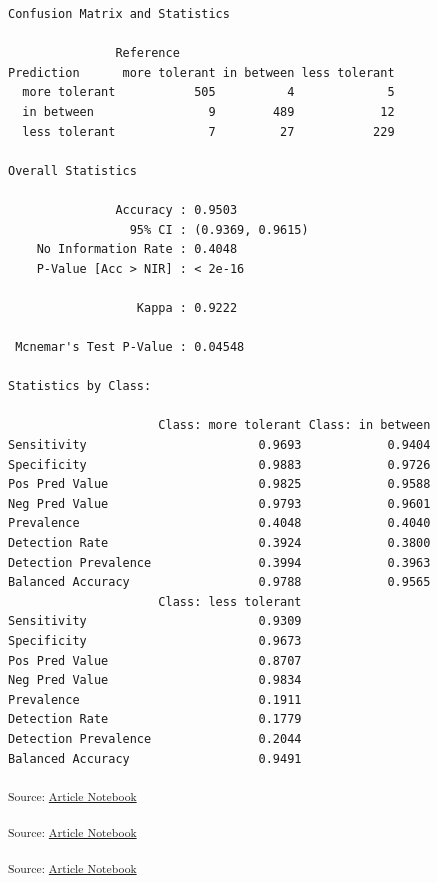 \documentclass[
  letterpaper,
  DIV=11,
  numbers=noendperiod]{scrartcl}
\begin{document}
\begin{verbatim}
Confusion Matrix and Statistics

               Reference
Prediction      more tolerant in between less tolerant
  more tolerant           505          4             5
  in between                9        489            12
  less tolerant             7         27           229

Overall Statistics
                                          
               Accuracy : 0.9503          
                 95% CI : (0.9369, 0.9615)
    No Information Rate : 0.4048          
    P-Value [Acc > NIR] : < 2e-16         
                                          
                  Kappa : 0.9222          
                                          
 Mcnemar's Test P-Value : 0.04548         

Statistics by Class:

                     Class: more tolerant Class: in between
Sensitivity                        0.9693            0.9404
Specificity                        0.9883            0.9726
Pos Pred Value                     0.9825            0.9588
Neg Pred Value                     0.9793            0.9601
Prevalence                         0.4048            0.4040
Detection Rate                     0.3924            0.3800
Detection Prevalence               0.3994            0.3963
Balanced Accuracy                  0.9788            0.9565
                     Class: less tolerant
Sensitivity                        0.9309
Specificity                        0.9673
Pos Pred Value                     0.8707
Neg Pred Value                     0.9834
Prevalence                         0.1911
Detection Rate                     0.1779
Detection Prevalence               0.2044
Balanced Accuracy                  0.9491
\end{verbatim}

\textsubscript{Source:
\href{https://h-christy.github.io/data-ethics-final/index.qmd.html}{Article
Notebook}}

\textsubscript{Source:
\href{https://h-christy.github.io/data-ethics-final/index.qmd.html}{Article
Notebook}}

\textsubscript{Source:
\href{https://h-christy.github.io/data-ethics-final/index.qmd.html}{Article
Notebook}}
\end{document}
